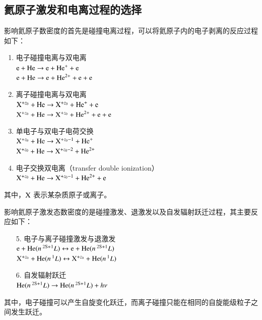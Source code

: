 
\subsection{氦原子激发和电离过程的选择}

影响氦原子数密度的首先是碰撞电离过程，可以将氦原子内的电子剥离的反应过程如下\cite{Anderson1999:Thesis}：
\begin{enumerate}
  \item 电子碰撞电离与双电离\\
        ${\rm e}+{\rm He}\to {\rm e}+{\rm He}^+ + {\rm e}$\\
        ${\rm e}+{\rm He}\to {\rm e}+{\rm He}^{2+} + {\rm e} + {\rm e}$
  \item 离子碰撞电离与双电离\\
        ${\rm X}^{+z_0} + {\rm He} \to {\rm X}^{+z_0} + {\rm He}^+ + {\rm e}$\\
        ${\rm X}^{+z_0} + {\rm He} \to {\rm X}^{+z_0} + {\rm He}^{2+} + {\rm e} + {\rm e}$
  \item 单电子与双电子电荷交换\\
        ${\rm X}^{+z_0} + {\rm He} \to {\rm X}^{+z_0-1} + {\rm He}^+ $\\
        ${\rm X}^{+z_0} + {\rm He} \to {\rm X}^{+z_0-2} + {\rm He}^{2+}$
  \item 电子交换双电离（transfer double ionization）\\
        ${\rm X}^{+z_0} + {\rm He} \to {\rm X}^{+z_0-1} + {\rm He}^{2+} + {\rm e}$
\end{enumerate}
其中，${\rm X}$ 表示某杂质原子或离子。

影响氦原子激发态数密度的是碰撞激发、退激发以及自发辐射跃迁过程，其主要反应如下\cite{Anderson1999:Thesis}：
\begin{enumerate}
  \item[5.] 电子与离子碰撞激发与退激发\\
        ${\rm e}+{\rm He}(n\,^{\rm 2S+1}{L}) \leftrightarrow {\rm e}+{\rm He}(n\,^{\rm 2S+1}{L})$\\
        ${\rm X}^{+z_0} + {\rm He}(n\,^{1}L) \leftrightarrow {\rm X}^{+z_0} + {\rm He}(n\,^{1}L)$
  \item[6.] 自发辐射跃迁\\
        ${\rm He}(n\,^{\rm 2S+1}L) \to  {\rm He}(n\,^{\rm 2S+1}L) + h\nu$
\end{enumerate}
其中，电子碰撞可以产生自旋变化跃迁，而离子碰撞只能在相同的自旋能级粒子之间发生跃迁。

